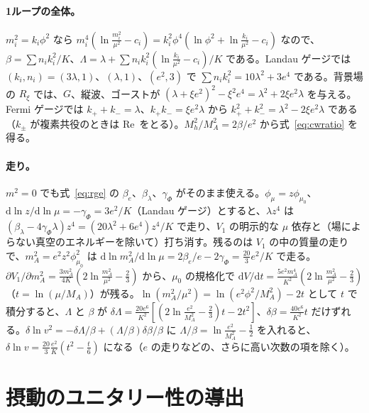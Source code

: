 \documentclass[a4paper,10pt]{ltjsarticle}
\newcommand{\dd}{\mathrm{d}}
\newcommand{\re}{\mathrm{Re}\,}
\begin{document}
\paragraph{1ループの全体。}$m_i^2=k_i\phi^2$ なら $m_i^4(\ln\frac{m_i^2}{\mu^2}-c_i)=k_i^2\phi^4(\ln\phi^2+\ln\frac{k_i}{\mu^2}-c_i)$ なので、$\beta=\sum n_ik_i^2/K$、$\Lambda=\lambda+\sum n_ik_i^2(\ln\frac{k_i}{\mu^2}-c_i)/K$ である。Landau ゲージでは $(k_i,n_i)=(3\lambda,1)$、$(\lambda,1)$、$(e^2,3)$ で $\sum n_ik_i^2=10\lambda^2+3e^4$ である。背景場の $R_\xi$ では、$G$、縦波、ゴーストが $(\lambda+\xi e^2)^2-\xi^2e^4=\lambda^2+2\xi e^2\lambda$ を与える。Fermi ゲージでは $k_++k_-=\lambda$、$k_+k_-=\xi e^2\lambda$ から $k_+^2+k_-^2=\lambda^2-2\xi e^2\lambda$ である（$k_\pm$ が複素共役のときは $\re$ をとる）。$M_h^2/M_A^2=2\beta/e^2$ から式~\eqref{eq:cwratio} を得る。

\paragraph{走り。}$m^2=0$ でも式~\eqref{eq:rge} の $\beta_e$、$\beta_\lambda$、$\gamma_\Phi$ がそのまま使える。$\phi_\mu=z\phi_{\mu_0}$、$\dd\ln z/\dd\ln\mu=-\gamma_\Phi=3e^2/K$（Landau ゲージ）とすると、$\lambda z^4$ は $(\beta_\lambda-4\gamma_\Phi\lambda)z^4=(20\lambda^2+6e^4)z^4/K$ で走り、$V_1$ の明示的な $\mu$ 依存と（場によらない真空のエネルギーを除いて）打ち消す。残るのは $V_1$ の中の質量の走りで、$m_A^2=e^2z^2\phi_{\mu_0}^2$ は $\dd\ln m_A^2/\dd\ln\mu=2\beta_e/e-2\gamma_\Phi=\frac{20}3e^2/K$ で走る。$\partial V_1/\partial m_A^2=\frac{3m_A^2}{4K}(2\ln\frac{m_A^2}{\mu^2}-\frac23)$ から、$\mu_0$ の規格化で $\dd V/\dd t=\frac{5e^2m_A^4}{K^2}(2\ln\frac{m_A^2}{\mu^2}-\frac23)$（$t=\ln(\mu/M_A)$）が残る。$\ln(m_A^2/\mu^2)=\ln(e^2\phi^2/M_A^2)-2t$ として $t$ で積分すると、$\Lambda$ と $\beta$ が $\delta\Lambda=\frac{20e^6}{K^2}[(2\ln\frac{e^2}{M_A^2}-\frac23)t-2t^2]$、$\delta\beta=\frac{40e^6}{K^2}t$ だけずれる。$\delta\ln v^2=-\delta\Lambda/\beta+(\Lambda/\beta)\delta\beta/\beta$ に $\Lambda/\beta=\ln\frac{e^2}{M_A^2}-\frac12$ を入れると、$\delta\ln v=\frac{20}3\frac{e^2}K(t^2-\frac t6)$ になる（$e$ の走りなどの、さらに高い次数の項を除く）。

\section{摂動のユニタリー性の導出}\label{app:unitarity}
\end{document}
